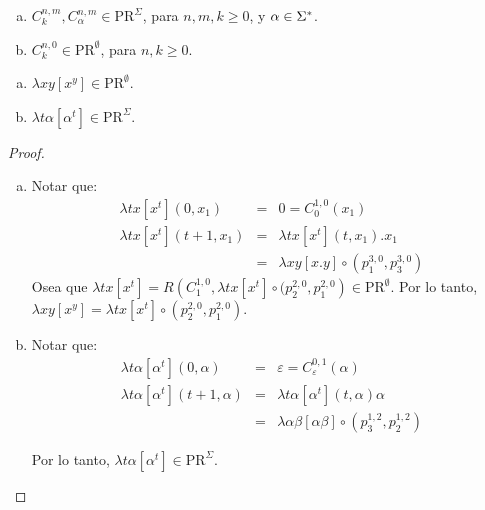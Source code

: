   \begin{lemma}
    \begin{enumerate}[a)]
      \item $C_{k}^{n,m}, C_{\alpha}^{n,m} \in \mathrm{PR}^{\Sigma}$, para $n, m, k \geq 0$, y $\alpha \in \Sigma^{\ast}$.
      \item $C_{k}^{n,0} \in \mathrm{PR}^{\emptyset}$, para $n, k \geq 0$.
    \end{enumerate}
  \end{lemma}

  \begin{lemma}
    \begin{enumerate}[a)]
      \item $\lambda xy \left[x^{y}\right] \in \mathrm{PR}^{\emptyset}$.
      \item $\lambda t\alpha \left[\alpha^{t}\right] \in \mathrm{PR}^{\Sigma}$.
    \end{enumerate}
  \end{lemma}
  \begin{proof}
    \begin{enumerate}[a)]
      \item Notar que:
        \begin{eqnarray*}
          \lambda tx \left[x^{t}\right](0, x_{1}) &=& 0 = C_{0}^{1,0}(x_{1}) \\
          \lambda tx \left[x^{t}\right](t+1, x_{1}) &=& \lambda tx \left[x^{t}\right](t, x_{1}) . x_{1} \\
          &=& \lambda xy \left[x.y\right] \circ (p_{1}^{3,0}, p_{3}^{3,0})
        \end{eqnarray*}
        \PN Osea que $\lambda tx \left[x^{t}\right] = R\left(C_{1}^{1,0}, \lambda tx \left[x^{t}\right] \circ
        (p_{2}^{2,0}, p_{1}^{2,0}\right) \in \mathrm{PR}^{\emptyset}$.
        \PN Por lo tanto, $\lambda xy \left[x^{y}\right] = \lambda tx \left[x^{t}\right] \circ (p_{2}^{2,0},
        p_{1}^{2,0})$.

      \item Notar que:
      \begin{eqnarray*}
        \lambda t\alpha \left[\alpha^{t}\right](0, \alpha) &=& \varepsilon = C_{\varepsilon}^{0,1}(\alpha) \\
        \lambda t\alpha \left[\alpha^{t}\right](t+1, \alpha) &=& \lambda t\alpha \left[\alpha^{t}\right](t,
          \alpha) \alpha \\
        &=& \lambda \alpha\beta \left[\alpha\beta \right] \circ \left(p_{3}^{1,2}, p_{2}^{1,2}\right)
      \end{eqnarray*}

      \PN Por lo tanto, $\lambda t\alpha \left[\alpha^{t}\right] \in \mathrm{PR}^{\Sigma}$.
    \end{enumerate}
  \end{proof}

